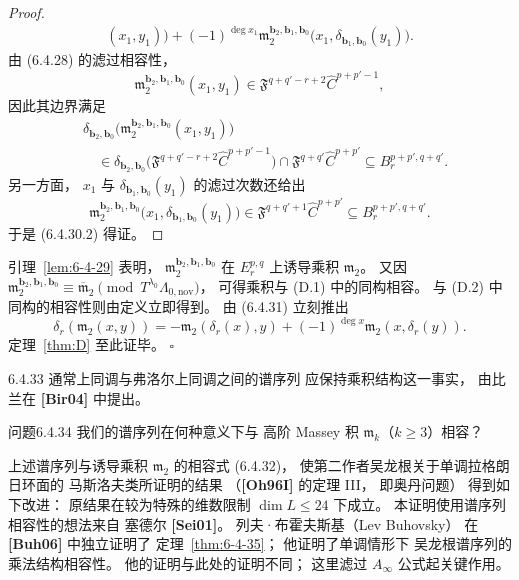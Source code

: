 \begin{proof}
\[\begin{aligned}
(x_1,y_1)\bigr)
+(-1)^{\deg x_1}
\mathfrak m_2^{\mathbf b_2,\mathbf b_1,\mathbf b_0}
\bigl(x_1,\delta_{\mathbf b_1,\mathbf b_0}(y_1)\bigr).
\end{aligned}
\]
由 (6.4.28) 的滤过相容性，
\[
\mathfrak m_2^{\mathbf b_2,\mathbf b_1,\mathbf b_0}(x_1,y_1)
\in\mathfrak F^{q+q'-r+2}\widehat C^{p+p'-1},
\]
因此其边界满足
\[
\begin{aligned}
&\delta_{\mathbf b_2,\mathbf b_0}
\bigl(\mathfrak m_2^{\mathbf b_2,\mathbf b_1,\mathbf b_0}
(x_1,y_1)\bigr)\\
&\quad\in
\delta_{\mathbf b_2,\mathbf b_0}
\bigl(\mathfrak F^{q+q'-r+2}
\widehat C^{p+p'-1}\bigr)
\cap\mathfrak F^{q+q'}\widehat C^{p+p'}
\subseteq B_r^{p+p',q+q'}.
\end{aligned}
\]
另一方面，
$x_1$ 与 $\delta_{\mathbf b_1,\mathbf b_0}(y_1)$
的滤过次数还给出
\[
\mathfrak m_2^{\mathbf b_2,\mathbf b_1,\mathbf b_0}
\bigl(x_1,\delta_{\mathbf b_1,\mathbf b_0}(y_1)\bigr)
\in\mathfrak F^{q+q'+1}\widehat C^{p+p'}
\subseteq B_r^{p+p',q+q'}.
\]
于是 (6.4.30.2) 得证。
\end{proof}

引理~\ref{lem:6-4-29} 表明，
$\mathfrak m_2^{\mathbf b_2,\mathbf b_1,\mathbf b_0}$
在 $E_r^{p,q}$ 上诱导乘积 $\mathfrak m_2$。
又因
$\mathfrak m_2^{\mathbf b_2,\mathbf b_1,\mathbf b_0}
\equiv\overline{\mathfrak m}_2
\pmod{T^{\lambda_0}\Lambda_{0,\mathrm{nov}}}$，
可得乘积与 \textup{(D.1)} 中的同构相容。
与 \textup{(D.2)} 中同构的相容性则由定义立即得到。
由 (6.4.31) 立刻推出
\begin{equation}
\delta_r(\mathfrak m_2(x,y))
=-\mathfrak m_2(\delta_r(x),y)
+(-1)^{\deg x}\mathfrak m_2(x,\delta_r(y)).
\tag{6.4.32}\label{eq:6-4-32}
\end{equation}
定理~\ref{thm:D} 至此证毕。
\hfill$\square$

\begin{remark}{6.4.33}\label{rem:6-4-33}
通常上同调与弗洛尔上同调之间的谱序列
应保持乘积结构这一事实，
由比兰在 \textbf{[Bir04]} 中提出。
\end{remark}

\begin{statement}{问题}{6.4.34}\label{prob:6-4-34}
我们的谱序列在何种意义下与
高阶 Massey 积
$\mathfrak m_k$（$k\ge3$）相容？
\end{statement}

上述谱序列与诱导乘积 $\mathfrak m_2$
的相容式 (6.4.32)，
使第二作者吴龙根关于单调拉格朗日环面的
马斯洛夫类所证明的结果
（\textbf{[Oh96I]} 的定理 III，
即奥丹问题）
得到如下改进：
原结果在较为特殊的维数限制
$\dim L\le24$ 下成立。
本证明使用谱序列相容性的想法来自
塞德尔 \textbf{[Sei01]}。
列夫·布霍夫斯基（Lev Buhovsky）
在 \textbf{[Buh06]} 中独立证明了
定理~\ref{thm:6-4-35}；
他证明了单调情形下
吴龙根谱序列的乘法结构相容性。
他的证明与此处的证明不同；
这里滤过 $A_\infty$ 公式起关键作用。

